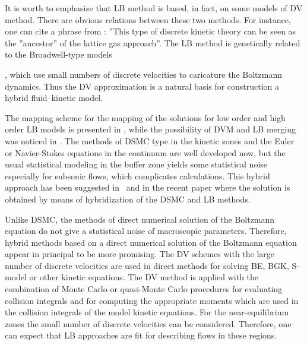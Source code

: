 \documentclass[]{elsarticle} %
\begin{document}
It is  worth to emphasize that LB method is based, in fact, on some models of DV method. There are obvious relations between these two methods. For instance, one can cite a phrase from \cite{Rivet2001}: ''This type of discrete kinetic theory can be seen as the ''ancestor'' of the lattice gas approach''. The LB method is genetically related to the Broadwell-type models~{\cite{Broadwell1964shock, Gatignol1975}, which use small numbers of discrete velocities to caricature the Boltzmann dynamics. Thus the DV approximation is a natural basis for construction a hybrid fluid--kinetic model.

The  mapping scheme for the mapping of the solutions for low order
and  high order LB models is  presented in \cite{Meng2011}, while the possibility of DVM and LB merging  was noticed in \cite{Succi2016}.
The methods of DSMC type in the kinetic zones and the Euler or Navier-Stokes equations in the continuum are well developed  now, but the usual statistical modeling in the buffer zone yields some statistical noise especially for subsonic flows, which complicates calculations. This hybrid approach has been suggested in~\cite{Staso2016short, Staso2016long}  and in the recent paper \cite{Staso2018} where the solution is obtained by means of hybridization of the DSMC and LB methods.

Unlike DSMC, the methods of direct numerical solution of the Boltzmann equation do not give a statistical noise of macroscopic parameters. Therefore, hybrid methods based on a direct numerical solution of the Boltzmann equation appear in principal to be more promising. The DV schemes with the large number of discrete velocities are used in direct methods for solving BE, BGK, S-model or other kinetic equations. The DV method is applied with the combination of Monte Carlo or quasi-Monte Carlo procedures for evaluating collision integrals and for computing the appropriate moments which are used in the collision integrals of the model kinetic equations. For the near-equilibrium zones the small number of discrete velocities can be considered. Therefore, one can expect that LB approaches are fit for describing flows in these regions.

}
\end{document}
